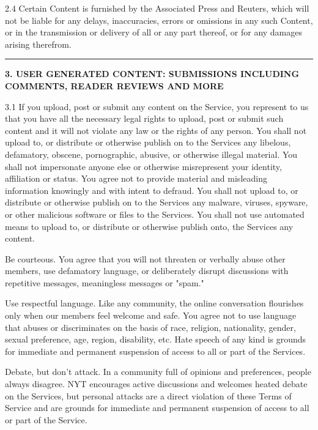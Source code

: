 2.4 Certain Content is furnished by the Associated Press and Reuters,
which will not be liable for any delays, inaccuracies, errors or
omissions in any such Content, or in the transmission or delivery of all
or any part thereof, or for any damages arising therefrom.

\begin{center}\rule{0.5\linewidth}{\linethickness}\end{center}

\textbf{3. USER GENERATED CONTENT: SUBMISSIONS INCLUDING COMMENTS,
READER REVIEWS AND MORE}

3.1 If you upload, post or submit any content on the Service, you
represent to us that you have all the necessary legal rights to upload,
post or submit such content and it will not violate any law or the
rights of any person. You shall not upload to, or distribute or
otherwise publish on to the Services any libelous, defamatory, obscene,
pornographic, abusive, or otherwise illegal material. You shall not
impersonate anyone else or otherwise misrepresent your identity,
affiliation or status. You agree not to provide material and misleading
information knowingly and with intent to defraud. You shall not upload
to, or distribute or otherwise publish on to the Services any malware,
viruses, spyware, or other malicious software or files to the Services.
You shall not use automated means to upload to, or distribute or
otherwise publish onto, the Services any content.

Be courteous. You agree that you will not threaten or verbally abuse
other members, use defamatory language, or deliberately disrupt
discussions with repetitive messages, meaningless messages or "spam."

Use respectful language. Like any community, the online conversation
flourishes only when our members feel welcome and safe. You agree not to
use language that abuses or discriminates on the basis of race,
religion, nationality, gender, sexual preference, age, region,
disability, etc. Hate speech of any kind is grounds for immediate and
permanent suspension of access to all or part of the Services.

Debate, but don't attack. In a community full of opinions and
preferences, people always disagree. NYT encourages active discussions
and welcomes heated debate on the Services, but personal attacks are a
direct violation of these Terms of Service and are grounds for immediate
and permanent suspension of access to all or part of the Service.

